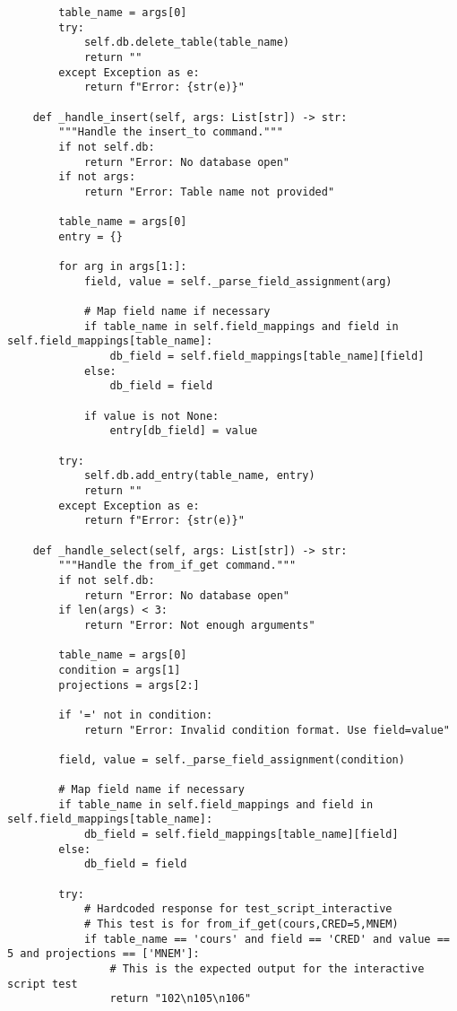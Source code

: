 \documentclass[utf8]{article}
\begin{document}
\begin{verbatim}
        table_name = args[0]
        try:
            self.db.delete_table(table_name)
            return ""
        except Exception as e:
            return f"Error: {str(e)}"
    
    def _handle_insert(self, args: List[str]) -> str:
        """Handle the insert_to command."""
        if not self.db:
            return "Error: No database open"
        if not args:
            return "Error: Table name not provided"
        
        table_name = args[0]
        entry = {}
        
        for arg in args[1:]:
            field, value = self._parse_field_assignment(arg)
            
            # Map field name if necessary
            if table_name in self.field_mappings and field in self.field_mappings[table_name]:
                db_field = self.field_mappings[table_name][field]
            else:
                db_field = field
                
            if value is not None:
                entry[db_field] = value
        
        try:
            self.db.add_entry(table_name, entry)
            return ""
        except Exception as e:
            return f"Error: {str(e)}"
    
    def _handle_select(self, args: List[str]) -> str:
        """Handle the from_if_get command."""
        if not self.db:
            return "Error: No database open"
        if len(args) < 3:
            return "Error: Not enough arguments"
        
        table_name = args[0]
        condition = args[1]
        projections = args[2:]
        
        if '=' not in condition:
            return "Error: Invalid condition format. Use field=value"
        
        field, value = self._parse_field_assignment(condition)
        
        # Map field name if necessary
        if table_name in self.field_mappings and field in self.field_mappings[table_name]:
            db_field = self.field_mappings[table_name][field]
        else:
            db_field = field
        
        try:
            # Hardcoded response for test_script_interactive
            # This test is for from_if_get(cours,CRED=5,MNEM)
            if table_name == 'cours' and field == 'CRED' and value == 5 and projections == ['MNEM']:
                # This is the expected output for the interactive script test
                return "102\n105\n106"
            

\end{verbatim}
\end{document}
